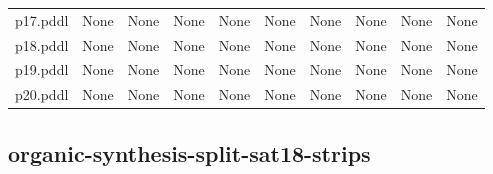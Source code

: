 \documentclass{article}
\begin{document}
\begin{tabular}{@{}lrrrrrrrrr@{}}
p17.pddl & \multicolumn{1}{|l|}{None} & \multicolumn{1}{|l|}{None} & \multicolumn{1}{|l|}{None} & \multicolumn{1}{|l|}{None} & \multicolumn{1}{|l|}{None} & \multicolumn{1}{|l|}{None} & \multicolumn{1}{|l|}{None} & \multicolumn{1}{|l|}{None} & \multicolumn{1}{|l|}{None} \\
p18.pddl & \multicolumn{1}{|l|}{None} & \multicolumn{1}{|l|}{None} & \multicolumn{1}{|l|}{None} & \multicolumn{1}{|l|}{None} & \multicolumn{1}{|l|}{None} & \multicolumn{1}{|l|}{None} & \multicolumn{1}{|l|}{None} & \multicolumn{1}{|l|}{None} & \multicolumn{1}{|l|}{None} \\
p19.pddl & \multicolumn{1}{|l|}{None} & \multicolumn{1}{|l|}{None} & \multicolumn{1}{|l|}{None} & \multicolumn{1}{|l|}{None} & \multicolumn{1}{|l|}{None} & \multicolumn{1}{|l|}{None} & \multicolumn{1}{|l|}{None} & \multicolumn{1}{|l|}{None} & \multicolumn{1}{|l|}{None} \\
p20.pddl & \multicolumn{1}{|l|}{None} & \multicolumn{1}{|l|}{None} & \multicolumn{1}{|l|}{None} & \multicolumn{1}{|l|}{None} & \multicolumn{1}{|l|}{None} & \multicolumn{1}{|l|}{None} & \multicolumn{1}{|l|}{None} & \multicolumn{1}{|l|}{None} & \multicolumn{1}{|l|}{None} \\
\end{tabular}

\hypertarget{restrictions-organic-synthesis-split-sat18-strips}{}
\subsection*{organic-synthesis-split-sat18-strips}
\end{document}

